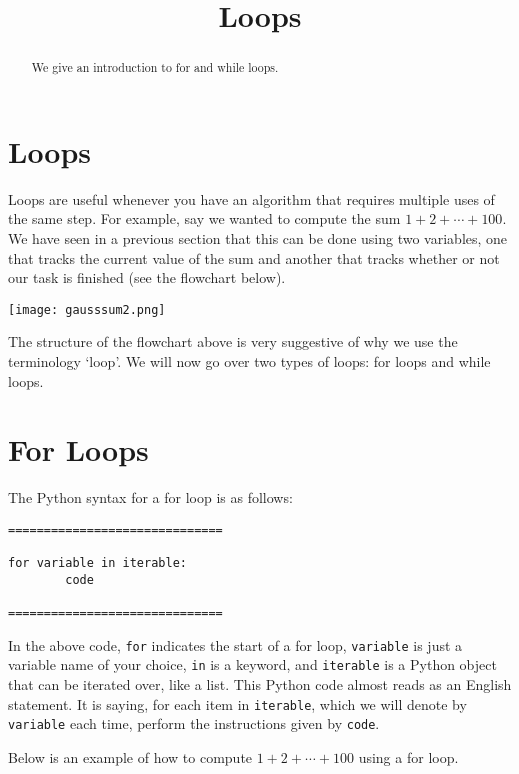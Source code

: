 \documentclass{ximera}
\title{Loops}
\begin{document}
  
\begin{abstract}  
We give an introduction to for and while loops.
\end{abstract}  
\maketitle

\section{Loops}

Loops are useful whenever you have an algorithm that requires multiple uses of the same step. For example, say we wanted to compute the sum $1+2+\cdots+100$. We have seen in a previous section that this can be done using two variables, one that tracks the current value of the sum and another that tracks whether or not our task is finished (see the flowchart below).

\begin{center}
	    \texttt{[image: gausssum2.png]}
\end{center}

The structure of the flowchart above is very suggestive of why we use the terminology `loop'. We will now go over two types of loops: for loops and while loops.

\section{For Loops}

The Python syntax for a for loop is as follows:

\begin{verbatim}
==============================

for variable in iterable:
        code

==============================
\end{verbatim}

In the above code, \verb|for| indicates the start of a for loop, \verb|variable| is just a variable name of your choice, \verb|in| is a keyword, and \verb|iterable| is a Python object that can be iterated over, like a list. This Python code almost reads as an English statement. It is saying, for each item in \verb|iterable|, which we will denote by \verb|variable| each time, perform the instructions given by \verb|code|.

Below is an example of how to compute $1+2+\cdots+100$ using a for loop. 
\end{document}
